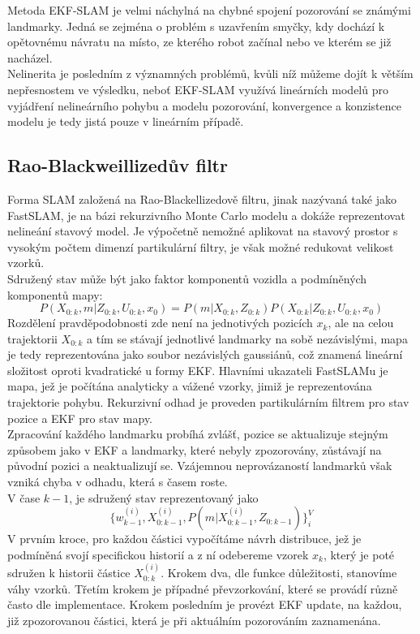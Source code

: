 \documentclass[11pt]{article}
\begin{document}
\indent Metoda EKF-SLAM je velmi náchylná na chybné spojení pozorování se známými landmarky. Jedná se zejména o problém s uzavřením smyčky, kdy dochází k opětovnému návratu na místo, ze kterého robot začínal nebo ve kterém se již nacházel.\\
\indent Nelinerita je posledním z významných problémů, kvůli níž můžeme dojít k větším nepřesnostem ve výsledku, neboť EKF-SLAM využívá lineárních modelů pro vyjádření nelineárního pohybu a modelu pozorování, konvergence a konzistence modelu je tedy jistá pouze v lineárním případě. 

\subsection{Rao-Blackweillizedův filtr}
Forma SLAM založená na Rao-Blackellizedově filtru, jinak nazývaná také jako FastSLAM, je na bázi rekurzivního Monte Carlo modelu a dokáže reprezentovat nelineání stavový model. Je výpočetně nemožné aplikovat na stavový prostor s vysokým počtem dimenzí partikulární filtry, je však možné redukovat velikost vzorků. \\
Sdružený stav může být jako faktor komponentů vozidla a podmíněných komponentů mapy:
$$P(X_{0:k},m|Z_{0:k},U_{0:k},x_0)=P(m|X_{0:k},Z_{0:k})P(X_{0:k}|Z_{0:k},U_{0:k},x_0) $$ 
Rozdělení pravděpodobnosti zde není na jednotivých pozicích $x_k$, ale na celou trajektorii $X_{0:k}$ a tím se stávají jednotlivé landmarky na sobě nezávislými, mapa je tedy reprezentována jako soubor nezávislých gaussiánů, což znamená lineární složitost oproti kvadratické u formy EKF. Hlavními ukazateli FastSLAMu je mapa, jež je počítána analyticky a vážené vzorky, jimiž je reprezentována trajektorie pohybu. Rekurzivní odhad je proveden partikulárním filtrem pro stav pozice a EKF pro stav mapy.\\
\indent Zpracování každého landmarku probíhá zvlášť, pozice se aktualizuje stejným způsobem jako v EKF a landmarky, které nebyly zpozorovány, zůstávají na původní pozici a neaktualizují se. Vzájemnou neprovázaností landmarků však vzniká chyba v odhadu, která s časem roste.\\
\indent V čase $k-1$, je sdružený stav reprezentovaný jako 
$$\{w^{(i)}_{k-1},X^{(i)}_{0:k-1},P(m|X^{(i)}_{0:k-1},Z_{0:k-1})\}^V_i$$
V prvním kroce, pro každou částici vypočítáme návrh distribuce, jež je podmíněná svojí specifickou historií a z ní odebereme vzorek $x_k$, který je poté sdružen k historii částice $X^{(i)}_{0:k}$. Krokem dva, dle funkce důležitosti, stanovíme váhy vzorků. Třetím krokem je případné převzorkování, které se provádí různě často dle implementace. Krokem posledním je provézt EKF update, na každou, již zpozorovanou částici, která je při aktuálním pozorováním zaznamenána. \\
\end{document}
